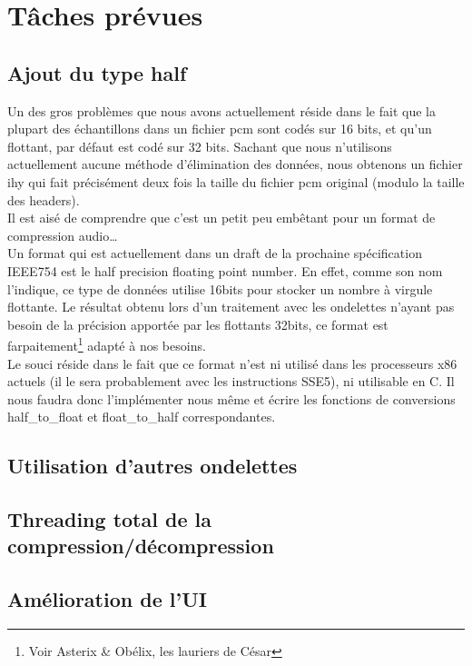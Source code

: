 \documentclass[a4paper,12pt]{article}
\begin{document}
\section{Tâches prévues}

	\subsection{Ajout du type half}
Un des gros problèmes que nous avons actuellement réside dans le fait que la
plupart des échantillons dans un fichier pcm sont codés sur 16 bits, et qu'un
flottant, par défaut est codé sur 32 bits. Sachant que nous n'utilisons
actuellement aucune méthode d'élimination des données, nous obtenons un
fichier ihy qui fait précisément deux fois la taille du fichier pcm original
(modulo la taille des headers).\\
Il est aisé de comprendre que c'est un petit peu embêtant pour un format de
compression audio\ldots\\
Un format qui est actuellement dans un draft de la prochaine spécification
IEEE754 est le half precision floating point number. En effet, comme son nom
l'indique, ce type de données utilise 16bits pour stocker un nombre à virgule
flottante. Le résultat obtenu lors d'un traitement avec les ondelettes n'ayant
pas besoin de la précision apportée par les flottants 32bits, ce format est
farpaitement\footnote{Voir Asterix \& Obélix, les lauriers de César} adapté à nos
besoins.\\
Le souci réside dans le fait que ce format n'est ni utilisé dans les processeurs
x86 actuels (il le sera probablement avec les instructions SSE5), ni utilisable
en C. Il nous faudra donc l'implémenter nous même et écrire les fonctions de
conversions half\_to\_float et float\_to\_half correspondantes.

	\subsection{Utilisation d'autres ondelettes}

	\subsection{Threading total de la compression/décompression}

	\subsection{Amélioration de l'UI}
\end{document}
